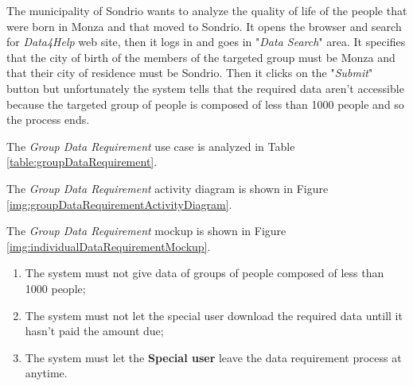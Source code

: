 The municipality of Sondrio wants to analyze the quality of life of the people that were born in Monza and that moved to Sondrio.  It opens the browser and search for \textit{Data4Help} web site, then it logs in and goes in "\textit{Data Search}" area. It specifies that the city of birth of the members of the targeted group must be Monza and that their city of residence must be Sondrio. Then it clicks on the "\textit{Submit}" button but unfortunately the system tells that the required data aren't accessible because the targeted group of people is composed of less than 1000 people and so the process ends.

The \textit{Group Data Requirement} use case is analyzed in Table \ref{table:groupDataRequirement}.

The \textit{Group Data Requirement} activity diagram is shown in Figure \ref{img:groupDataRequirementActivityDiagram}.

The \textit{Group Data Requirement} mockup is shown in Figure \ref{img:individualDataRequirementMockup}.

\begin{enumerate}
  \item The system must not give data of groups of people composed of less than 1000 people;
  \item The system must not let the special user download the required data untill it hasn't paid the amount due;
  \item The system must let the \textbf{Special user} leave the data requirement process at anytime.
\end{enumerate}

